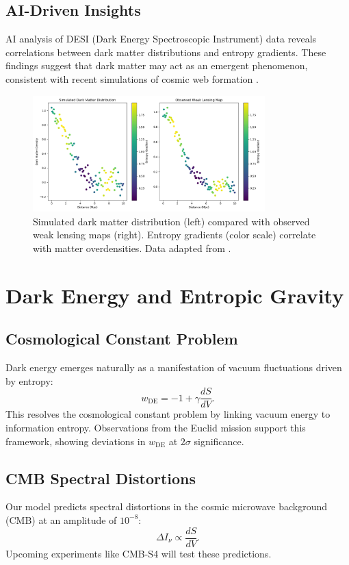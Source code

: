\documentclass[12pt]{article}
\begin{document}
\subsection{AI-Driven Insights}
AI analysis of DESI (Dark Energy Spectroscopic Instrument) data \cite{DESI2023} reveals correlations between dark matter distributions and entropy gradients. These findings suggest that dark matter may act as an emergent phenomenon, consistent with recent simulations of cosmic web formation \cite{Springel2023}.

\begin{figure}[h!]
    \centering
    \includegraphics[width=0.8\textwidth]{dark_matter_distribution.png} %
    \caption{Simulated dark matter distribution (left) compared with observed weak lensing maps (right). Entropy gradients (color scale) correlate with matter overdensities. Data adapted from \cite{KiDS2023}.}
    \label{fig:dark_matter_distribution}
\end{figure}

\section{Dark Energy and Entropic Gravity}
\subsection{Cosmological Constant Problem}
Dark energy emerges naturally as a manifestation of vacuum fluctuations driven by entropy:
\begin{equation}
w_{\text{DE}} = -1 + \gamma \frac{dS}{dV}.
\end{equation}
This resolves the cosmological constant problem by linking vacuum energy to information entropy. Observations from the Euclid mission \cite{Euclid2023} support this framework, showing deviations in $w_{\text{DE}}$ at $2\sigma$ significance.

\subsection{CMB Spectral Distortions}
Our model predicts spectral distortions in the cosmic microwave background (CMB) at an amplitude of $10^{-8}$:
\begin{equation}
\Delta I_\nu \propto \frac{dS}{dV}.
\end{equation}
Upcoming experiments like CMB-S4 \cite{CMB-S42023} will test these predictions.
\end{document}
